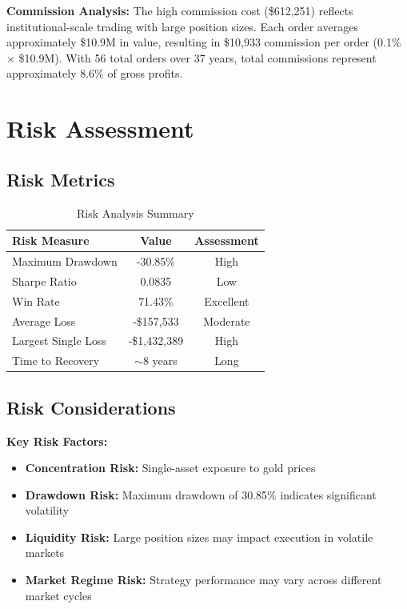 \documentclass[11pt,a4paper]{article}
\begin{document}
\vspace{0.5cm}

\textbf{Commission Analysis:} The high commission cost (\$612,251) reflects institutional-scale trading with large position sizes. Each order averages approximately \$10.9M in value, resulting in \$10,933 commission per order (0.1\% $\times$ \$10.9M). With 56 total orders over 37 years, total commissions represent approximately 8.6\% of gross profits.


\section{Risk Assessment}

\subsection{Risk Metrics}

\begin{table}[H]
\centering
\begin{tabular}{lcc}
\toprule
\textbf{Risk Measure} & \textbf{Value} & \textbf{Assessment} \\
\midrule
Maximum Drawdown & -30.85\% & \textcolor{loss}{High} \\
Sharpe Ratio & 0.0835 & \textcolor{loss}{Low} \\
Win Rate & 71.43\% & \textcolor{profit}{Excellent} \\
Average Loss & -\$157,533 & \textcolor{neutral}{Moderate} \\
Largest Single Loss & -\$1,432,389 & \textcolor{loss}{High} \\
Time to Recovery & $\sim$8 years & \textcolor{loss}{Long} \\
\bottomrule
\end{tabular}
\caption{Risk Analysis Summary}
\end{table}

\subsection{Risk Considerations}

\textbf{Key Risk Factors:}
\begin{itemize}
    \item \textbf{Concentration Risk:} Single-asset exposure to gold prices
    \item \textbf{Drawdown Risk:} Maximum drawdown of 30.85\% indicates significant volatility
    \item \textbf{Liquidity Risk:} Large position sizes may impact execution in volatile markets
    \item \textbf{Market Regime Risk:} Strategy performance may vary across different market cycles
\end{itemize}
\end{document}
